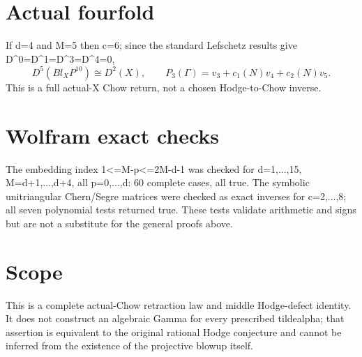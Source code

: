 \documentclass{article}
\begin{document}
\section*{Actual fourfold}
If d=4 and M=5 then c=6; since the standard
Lefschetz results give D^0=D^1=D^3=D^4=0,
\[
 \boxed{D^5(Bl_X P^{10})\cong D^2(X),\qquad
 P_3(\Gamma)=v_3+c_1(N)v_4+c_2(N)v_5.}
\]
This is a full actual-X Chow return, not a
chosen Hodge-to-Chow inverse.

\section*{Wolfram exact checks}
The embedding index 1<=M-p<=2M-d-1 was checked for
d=1,...,15, M=d+1,...,d+4, all p=0,...,d:
60 complete cases, all true. The symbolic unitriangular
Chern/Segre matrices were checked as exact inverses for
c=2,...,8; all seven polynomial tests returned true.
These tests validate arithmetic and signs but are
not a substitute for the general proofs above.

\section*{Scope}
This is a complete actual-Chow retraction law and
middle Hodge-defect identity. It does not construct an
algebraic Gamma for every prescribed tildealpha;
that assertion is equivalent to the original rational
Hodge conjecture and cannot be inferred from the
existence of the projective blowup itself.
\end{document}
